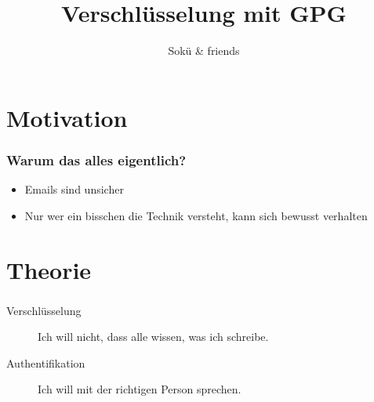 \documentclass[compress]{beamer}
\begin{document}
\title{Verschlüsselung mit GPG}  
\author{Sokü \& friends}
\date{} 

\frame{\titlepage} 


\section{Motivation}
\label{sec:motivation}

\begin{frame}
  \frametitle{Warum das alles eigentlich?}

  \begin{itemize}[<+(1)->]
  \item Emails sind unsicher
  \item Nur wer ein bisschen die Technik versteht, kann sich bewusst
    verhalten
  \end{itemize}
\end{frame}

\section{Theorie}
\label{sec:theorie}
\begin{frame}
    \frametitle{\insertsection}
    \begin{description}
        \item[Verschlüsselung] Ich will nicht, dass alle wissen, was ich schreibe.
        \item[Authentifikation] Ich will mit der richtigen Person sprechen.
    \end{description}
\end{frame}
\end{document}
